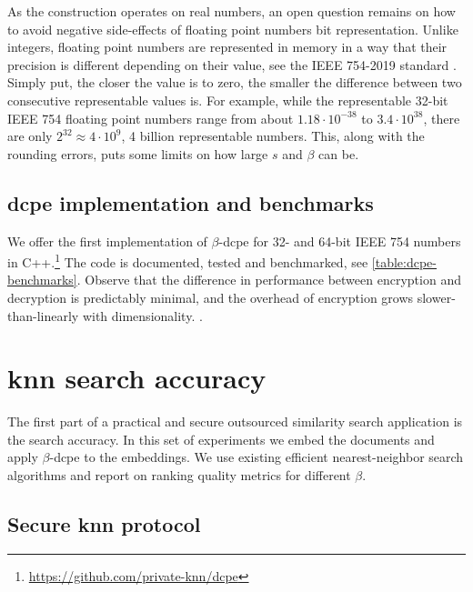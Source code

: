			As the construction operates on real numbers, an open question remains on how to avoid negative side-effects of floating point numbers bit representation.
			Unlike integers, floating point numbers are represented in memory in a way that their precision is different depending on their value, see the IEEE 754-2019 standard \cite{ieee-floating-point}. %
			Simply put, the closer the value is to zero, the smaller the difference between two consecutive representable values is.
			For example, while the representable 32-bit IEEE 754 floating point numbers range from about $1.18 \cdot 10^{-38}$ to $3.4 \cdot 10^{38}$, there are only $2^{32} \approx 4 \cdot 10^9$, 4 billion representable numbers.
			This, along with the rounding errors, puts some limits on how large $s$ and $\beta$ can be.

		\subsection{\texorpdfstring{\acrshort{dcpe}}{DCPE} implementation and benchmarks}

			We offer the first implementation of \cite{dcpe} $\beta$-\acrshort{dcpe} for 32- and 64-bit IEEE 754 numbers in C++.\footnote{
				\url{https://github.com/private-knn/dcpe}
			}
			The code is documented, tested and benchmarked, see \cref{table:dcpe-benchmarks}.
			Observe that the difference in performance between encryption and decryption is predictably minimal, and the overhead of encryption grows slower-than-linearly with dimensionality.
.
			

	\section{\texorpdfstring{\acrshort{knn}}{kNN} search accuracy}\label{section:knn-snapshot:search}

		The first part of a practical and secure outsourced similarity search application is the search accuracy.
		In this set of experiments we embed the documents and apply $\beta$-\acrshort{dcpe} to the embeddings.
		We use existing efficient nearest-neighbor search algorithms and report on ranking quality metrics for different $\beta$.

		\subsection{Secure \texorpdfstring{\acrshort{knn}}{kNN} protocol}

